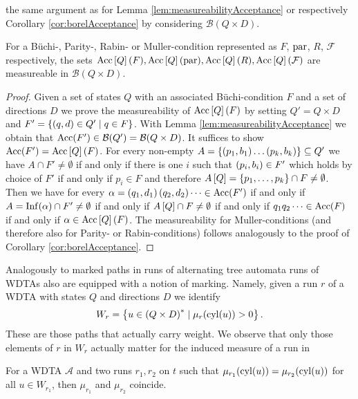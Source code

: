 the same argument as for Lemma \ref{lem:measureabilityAcceptance} or
respectively Corollary \ref{cor:borelAcceptance} by considering
$\mathcal{B}(Q\times D)$.
\begin{lemma}
  For a Büchi-, Parity-, Rabin- or Muller-condition represented as $F$, 
  $\operatorname{par}$, $R$, $\mathcal{F}$ respectively, the sets $\operatorname{Acc}\left[Q\right](F),
  \operatorname{Acc}\left[Q\right](\operatorname{par}),\operatorname{Acc}\left[Q\right](R),\operatorname{Acc}\left[Q\right](\mathcal{F})$
  are measureable in $\mathcal{B}(Q\times D)$.
  \label{lem:treeBorelAcceptance}
\end{lemma}
\begin{proof}
  Given a set of states $Q$ with an associated Büchi-condition $F$ and a set of 
  directions $D$ we prove the measureability of $\operatorname{Acc}\left[Q\right](F)$ by 
  setting $Q' = Q\times D$ and $F' = \left\{\left(q, d\right)\in Q'\mid q\in F\right\}$. With
  Lemma \ref{lem:measureabilityAcceptance} we obtain that 
  $\operatorname{Acc}(F')\in\mathcal{B}(Q') = \mathcal{B}(Q\times D)$. It suffices to show
  $\operatorname{Acc}(F') = \operatorname{Acc}\left[Q\right](F)$. For every non-empty
  $A = \left\{\left(p_{1},b_{1}\right)\dots\left(p_{k},b_{k}\right)\right\}\subseteq Q'$ we have
  $A\cap F'\neq\emptyset$ if and only if there is one $i$ such that 
  $\left(p_{i},b_{i}\right)\in F'$ which holds by choice of $F'$ if and only if
  $p_{i}\in F$ and therefore 
  $A\left[Q\right] = \left\{p_{1},\dots,p_{k}\right\}\cap F\neq\emptyset$. Then we have
  for every $\alpha = \left(q_{1},d_{1}\right)\left(q_{2},d_{2}\right)\dots\in\operatorname{Acc}(F')$ 
  if and only if $A = \operatorname{Inf}(\alpha)\cap F'\neq\emptyset$ if and only if 
  $A\left[Q\right]\cap F\neq\emptyset$ if and only if $q_{1}q_{2}\dots\in\operatorname{Acc}(F)$
  if and only if $\alpha\in\operatorname{Acc}\left[Q\right](F)$. The measureability for 
  Muller-conditions (and therefore also for Parity- or Rabin-conditions) 
  follows analogously to the proof of Corollary \ref{cor:borelAcceptance}.
\end{proof}
Analogously to marked paths in runs of alternating tree automata runs of
\acp{WDTA} also are equipped with a notion of marking. Namely, given a run $r$
of a \ac{WDTA} with states $Q$ and directions $D$ we identify
\begin{equation*}
  W_{r} = \left\{
    u\in\left(Q\times D\right)^{*}\mid\mu_{r}(\operatorname{cyl}(u)) > 0
  \right\}.
\end{equation*}
These are those paths that actually carry weight. We observe that only those
elements of $r$ in $W_{r}$ actually matter for the induced measure of a run in
\begin{lemma}
  For a \ac{WDTA} $\mathcal{A}$ and two runs $r_{1}, r_{2}$ on $t$ such that
  $\mu_{r_{1}}(\operatorname{cyl}(u)) = \mu_{r_{2}}(\operatorname{cyl}(u))$ for all $u\in W_{r_{1}}$, then
  $\mu_{r_{1}}$ and $\mu_{r_{2}}$ coincide.
  \label{lem:weightedpart}
\end{lemma}
